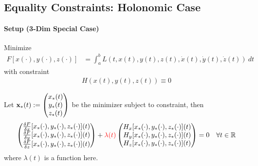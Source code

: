 \documentclass{article}
\begin{document}
	\subsection{Equality Constraints: Holonomic Case}
	\paragraph{Setup (3-Dim Special Case)} Minimize
	\begin{align}
		F[x(\cdot), y(\cdot), z(\cdot)]
		&= \int_a^b L(t, x(t), y(t), z(t), \dot{x}(t), \dot{y}(t), \dot{z}(t))\ dt
	\end{align}
	with constraint
	\begin{align}
		H(x(t), y(t), z(t)) \equiv 0
	\end{align}
	
	\begin{theorem}
		Let $\textbf{x}_*(t) := \begin{pmatrix}x_*(t)\\y_*(t)\\z_*(t)\end{pmatrix}$ be the minimizer subject to constraint, then
		\begin{align}
			\begin{pmatrix}
				\frac{\delta F}{\delta x}[x_*(\cdot), y_*(\cdot), z_*(\cdot)](t) \\
				\frac{\delta F}{\delta y}[x_*(\cdot), y_*(\cdot), z_*(\cdot)](t) \\
				\frac{\delta F}{\delta z}[x_*(\cdot), y_*(\cdot), z_*(\cdot)](t)
			\end{pmatrix}
			+ \textcolor{red}{\lambda(t)}
			\begin{pmatrix}
				H_x[x_*(\cdot), y_*(\cdot), z_*(\cdot)](t) \\
				H_y[x_*(\cdot), y_*(\cdot), z_*(\cdot)](t) \\
				H_z[x_*(\cdot), y_*(\cdot), z_*(\cdot)](t)
			\end{pmatrix} = 0\quad \forall t \in \mathbb{R}
		\end{align}
		where $\lambda(t)$ is a function here.
	\end{theorem}
	
\end{document}
